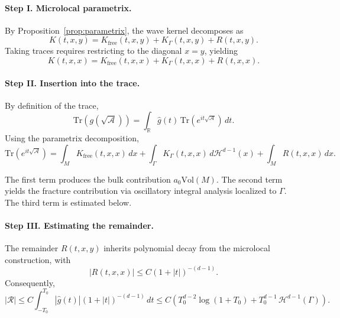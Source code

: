 
\paragraph{Step I. Microlocal parametrix.}
By Proposition~\ref{prop:parametrix}, the wave kernel decomposes as
\[
K(t,x,y) = K_{\text{free}}(t,x,y) + K_\Gamma(t,x,y) + R(t,x,y).
\]
Taking traces requires restricting to the diagonal $x=y$, yielding
\[
K(t,x,x) = K_{\text{free}}(t,x,x) + K_\Gamma(t,x,x) + R(t,x,x).
\]


\paragraph{Step II. Insertion into the trace.}
By definition of the trace,
\[
\mathrm{Tr}(g(\sqrt{\mathcal{A}})) = \int_{\mathbb{R}} \widehat{g}(t)\,\mathrm{Tr}(e^{it\sqrt{\mathcal{A}}})\,dt.
\]
Using the parametrix decomposition,
\[
\mathrm{Tr}(e^{it\sqrt{\mathcal{A}}}) =
\int_M K_{\text{free}}(t,x,x)\,dx
+ \int_\Gamma K_\Gamma(t,x,x)\,d\mathcal{H}^{d-1}(x)
+ \int_M R(t,x,x)\,dx.
\]

The first term produces the bulk contribution $a_0 \mathrm{Vol}(M)$.
The second term yields the fracture contribution via oscillatory integral
analysis localized to $\Gamma$.
The third term is estimated below.


\paragraph{Step III. Estimating the remainder.}
The remainder $R(t,x,y)$ inherits polynomial decay from the microlocal
construction, with
\[
|R(t,x,x)| \leq C(1+|t|)^{-(d-1)}.
\]
Consequently,
\[
|\mathcal{R}| \leq C \int_{-T_0}^{T_0} |\widehat{g}(t)| (1+|t|)^{-(d-1)}\,dt
\leq C\left( T_0^{d-2}\log(1+T_0) + T_0^{d-1}\,\mathcal{H}^{d-1}(\Gamma)\right).
\]


